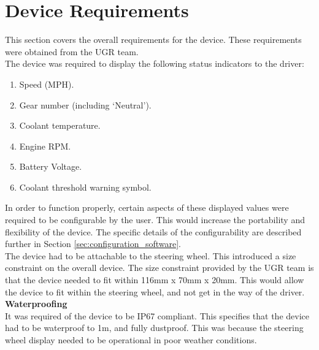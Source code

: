 \documentclass[a4paper,12pt]{article}
\begin{document}



\newpage
\section{Device Requirements}
\label{sec:device_requirements}

This section covers the overall requirements for the device. These requirements were obtained from the UGR team. \\

The device was required to display the following status indicators to the driver:

\begin{enumerate}
  \item Speed (MPH).
  \item Gear number (including `Neutral').
  \item Coolant temperature.
  \item Engine RPM.
  \item Battery Voltage.
  \item Coolant threshold warning symbol.
\end{enumerate}

In order to function properly, certain aspects of these displayed values were required to be configurable by the user. This would increase the portability and flexibility of the device. The specific details of the configurability are described further in Section \ref{sec:configuration_software}. \\

The device had to be attachable to the steering wheel. This introduced a size constraint on the overall device. The size constraint provided by the UGR team is that the device needed to fit within 116mm x 70mm x 20mm. This would allow the device to fit within the steering wheel, and not get in the way of the driver. \\

\textbf{Waterproofing} \\

It was required of the device to be IP67 compliant. This specifies that the device had to be waterproof to 1m, and fully dustproof. This was because the steering wheel display needed to be operational in poor weather conditions. \\
\end{document}
